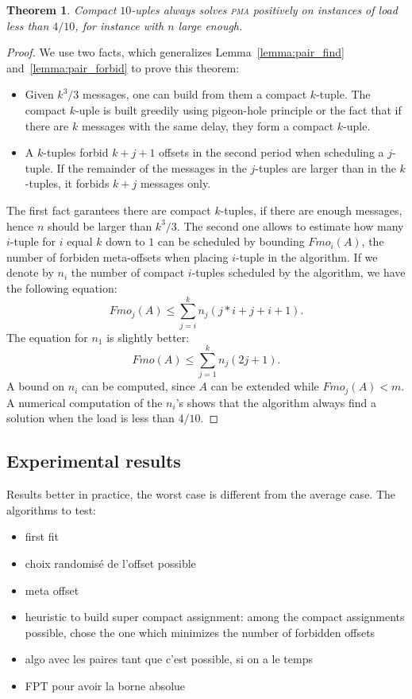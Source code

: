 \documentclass[10pt, conference, letterpaper]{IEEEtran}
\newtheorem{theorem}{Theorem}
\newcommand\pma{\textsc{pma}\xspace}
\begin{document}
\begin{theorem}
Compact $10$-uples always solves \pma positively on instances of load less than
$4/10$, for instance with $n$ large enough.
\end{theorem}
\begin{proof}
We use two facts, which generalizes Lemma~\ref{lemma:pair_find} and~\ref{lemma:pair_forbid} to prove this theorem:
\begin{itemize}
\item Given $ k^3/3$ messages, one can build from them a compact $k$-tuple. 
The compact $k$-uple is built greedily using pigeon-hole principle or the fact that if there are $k$ messages with the same delay, they form a compact $k$-uple.
\item A $k$-tuples forbid $k+j+1$ offsets in the second period when scheduling a 
$j$-tuple. If the remainder of the messages in the $j$-tuples are larger than in the 
$k$-tuples, it forbids $k+j$ messages only.
\end{itemize}

The first fact garantees there are compact $k$-tuples, if there are enough messages,
hence $n$ should be larger than $k^3/3$.
The second one allows to estimate how many $i$-tuple for $i$ equal $k$ down to $1$
can be scheduled by bounding $Fmo_i(A)$, the number of forbiden meta-offsets 
when placing $i$-tuple in the algorithm.
If we denote by $n_i$ the number of compact $i$-tuples scheduled by the algorithm,
we have the following equation:  $$ Fmo_j(A) \leq \displaystyle{\sum_{j=i}^k n_j(j*i + j + i+ 1)}.$$
The equation for $n_1$ is slightly better: 
$$ Fmo(A) \leq \displaystyle{\sum_{j=1}^k n_j(2j + 1)}.$$
A bound on $n_i$ can be computed, since $A$ can be extended while $Fmo_j(A) < m$. A numerical computation of the $n_i$'s shows that the algorithm always find a solution when the load is less than $4/10$.
\end{proof}



\subsection{Experimental results}

Results better in practice, the worst case is different from the 
average case.
The algorithms to test:
\begin{itemize}
	\item first fit
	\item choix randomisé de l'offset possible
	\item meta offset
	\item heuristic to build super compact assignment: among the compact assignments
possible, chose the one which minimizes the number of forbidden offsets
	\item algo avec les paires tant que c'est possible, si on a le temps
	\item FPT pour avoir la borne absolue
\end{itemize}
\end{document}
